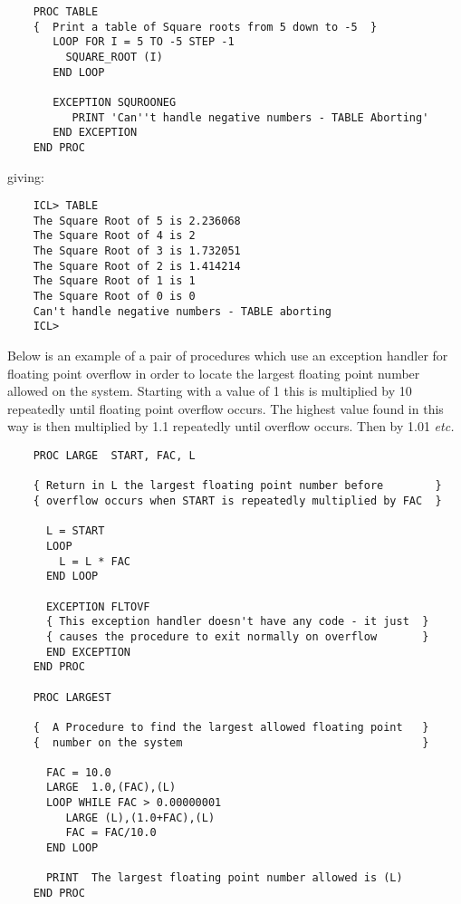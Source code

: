 \documentclass[twoside,11pt]{report}
\begin{document}
\begin{verbatim}
    PROC TABLE
    {  Print a table of Square roots from 5 down to -5  }
       LOOP FOR I = 5 TO -5 STEP -1
         SQUARE_ROOT (I)
       END LOOP

       EXCEPTION SQUROONEG
          PRINT 'Can''t handle negative numbers - TABLE Aborting'
       END EXCEPTION
    END PROC
\end{verbatim}

giving:

\begin{verbatim}
    ICL> TABLE
    The Square Root of 5 is 2.236068
    The Square Root of 4 is 2
    The Square Root of 3 is 1.732051
    The Square Root of 2 is 1.414214
    The Square Root of 1 is 1
    The Square Root of 0 is 0
    Can't handle negative numbers - TABLE aborting
    ICL>
\end{verbatim}

Below is an example of a pair of procedures which use an exception handler
for floating point overflow in order to locate the largest floating point
number allowed on the system. Starting with a value of 1 this is multiplied
by 10 repeatedly until floating point overflow occurs. The highest value
found in this way is then multiplied by 1.1 repeatedly until overflow occurs.
Then by 1.01 {\em etc.}

\begin{verbatim}
    PROC LARGE  START, FAC, L

    { Return in L the largest floating point number before        }
    { overflow occurs when START is repeatedly multiplied by FAC  }

      L = START
      LOOP
        L = L * FAC
      END LOOP

      EXCEPTION FLTOVF
      { This exception handler doesn't have any code - it just  }
      { causes the procedure to exit normally on overflow       }
      END EXCEPTION
    END PROC

    PROC LARGEST

    {  A Procedure to find the largest allowed floating point   }
    {  number on the system                                     }

      FAC = 10.0
      LARGE  1.0,(FAC),(L)
      LOOP WHILE FAC > 0.00000001
         LARGE (L),(1.0+FAC),(L)
         FAC = FAC/10.0
      END LOOP

      PRINT  The largest floating point number allowed is (L)
    END PROC
\end{verbatim}
\end{document}
